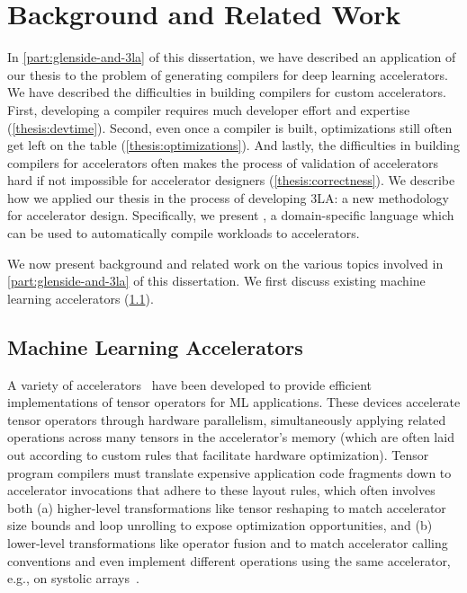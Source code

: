   
\chapter{Background and Related Work}
\label{sec:part1-background}

In \cref{part:glenside-and-3la}
  of this dissertation,
  we have described an application
  of our thesis
  to the problem of
  generating compilers
  for deep learning accelerators.
We have described 
  the difficulties in building
  compilers
  for custom accelerators.
First, developing a compiler
  requires much
  developer effort
  and expertise
  (\cref{thesis:devtime}).
Second,
  even once a compiler is built,
  optimizations still often
  get left on the table
  (\cref{thesis:optimizations}).
And lastly,
  the difficulties in
  building compilers
  for accelerators
  often makes the process
  of validation
  of accelerators
  hard if not impossible
  for accelerator designers
  (\cref{thesis:correctness}).
We describe how
  we applied our thesis
  in the process of developing
  3LA: a new methodology
  for accelerator design.
Specifically, we present
  \g,
  a domain-specific language
  which can be used to 
  automatically compile
  workloads to accelerators.

We now present background
  and related work
  on the various topics
  involved in
  \cref{part:glenside-and-3la}
  of this dissertation.
We first discuss existing
  machine learning accelerators
  (\cref{sec:part1:relatedwork:accelerators}).

\section{Machine Learning Accelerators}
\label{sec:part1:relatedwork:accelerators}

A variety of accelerators~\cite{
    jouppi2017tpu, chen2016eyeriss, moreau2018vta, markidis2018tensorcore, nvdla,
    genc2021gemmini}
  have been developed 
  to provide efficient implementations
  of tensor operators for ML applications.
These devices accelerate tensor operators 
  through hardware parallelism, 
  simultaneously applying related operations
  across many tensors in the accelerator's memory (which are often laid out according to custom rules that facilitate hardware optimization).
Tensor program compilers must translate
  expensive application code fragments
  down to accelerator invocations that
  adhere to these layout rules,
  which often involves both
  (a) higher-level transformations like
  tensor reshaping to match accelerator size bounds and
  loop unrolling to expose optimization opportunities, and
  (b) lower-level transformations like
  operator fusion and 
  to match accelerator calling conventions and
  even implement different operations
  using the same accelerator,
  e.g., on systolic arrays~\cite{im2col, jia2014semantic}.
  
